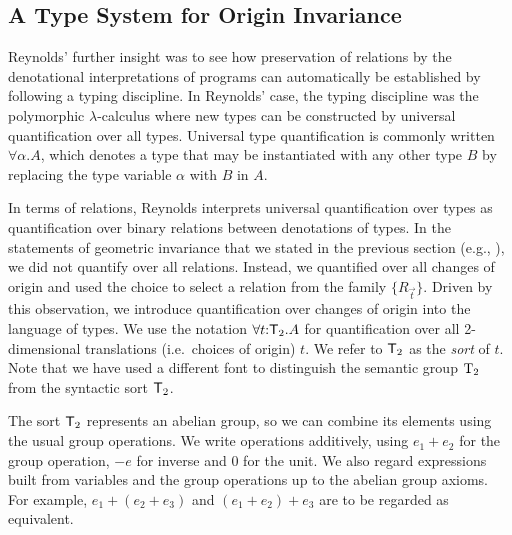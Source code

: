
\subsection{A Type System for Origin Invariance}
\label{sec:type-system-geom-intro}

Reynolds' further insight was to see how preservation of relations by
the denotational interpretations of programs can automatically be
established by following a typing discipline. In Reynolds' case, the
typing discipline was the polymorphic $\lambda$-calculus where new
types can be constructed by universal quantification over all
types. Universal type quantification is commonly written $\forall
\alpha. A$, which denotes a type that may be instantiated with any
other type $B$ by replacing the type variable $\alpha$ with $B$ in
$A$.

In terms of relations, Reynolds interprets universal quantification
over types as quantification over binary relations between denotations
of types. In the statements of geometric invariance that we stated in
the previous section (e.g., ), we
did not quantify over all relations. Instead, we quantified over all
changes of origin and used the choice to select a relation from the
family $\{R_{\vec{t}}\}$. Driven by this observation, we introduce
quantification over changes of origin into the language of types.  We
use the notation $\forall t \mathord: \mathsf{T}_2. A$ for
quantification over all 2-dimensional translations (i.e.~choices of
origin) $t$. We refer to $\mathsf{T}_2$ as the \emph{sort} of
$t$. Note that we have used a different font to distinguish the
semantic group $\mathrm{T}_2$ from the syntactic sort $\mathsf{T}_2$.

The sort $\mathsf{T}_2$ represents an abelian group, so we can combine
its elements using the usual group operations. We write operations
additively, using $e_1 + e_2$ for the group operation, $-e$ for
inverse and $0$ for the unit.  We also regard expressions built from
variables and the group operations up to the abelian group axioms. For
example, $e_1 + (e_2 + e_3)$ and $(e_1 + e_2) + e_3$ are to be
regarded as equivalent.

